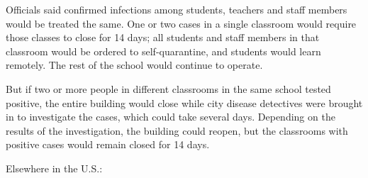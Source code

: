 Officials said confirmed infections among students, teachers and staff
members would be treated the same. One or two cases in a single
classroom would require those classes to close for 14 days; all students
and staff members in that classroom would be ordered to self-quarantine,
and students would learn remotely. The rest of the school would continue
to operate.

But if two or more people in different classrooms in the same school
tested positive, the entire building would close while city disease
detectives were brought in to investigate the cases, which could take
several days. Depending on the results of the investigation, the
building could reopen, but the classrooms with positive cases would
remain closed for 14 days.

Elsewhere in the U.S.:

